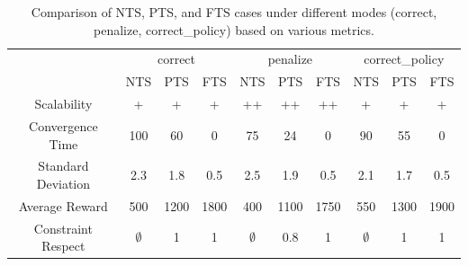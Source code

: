 \documentclass[runningheads]{llncs}
\theoremstyle{freethm}
\theoremstyle{proofoutline}
\begin{document}
\begin{table}[h!]
    \centering
    \caption{Comparison of NTS, PTS, and FTS cases under different modes (correct, penalize, correct\_policy) based on various metrics.\\}\label{tab:results}
    \setlength{\tabcolsep}{5pt}
    \begin{tabular}{cccccccccc}
        \cline{2-10}
                           & \multicolumn{3}{c}{correct} & \multicolumn{3}{c}{penalize} & \multicolumn{3}{c}{correct\_policy}                                                         \\
        \cline{2-10}
                           & NTS                         & PTS                          & FTS                                 & NTS         & PTS  & FTS  & NTS         & PTS  & FTS  \\
        \hline
        Scalability        & +                           & +                            & +                                   & ++          & ++   & ++   & +           & +    & +    \\
        Convergence Time   & 100                         & 60                           & 0                                   & 75          & 24   & 0    & 90          & 55   & 0    \\
        Standard Deviation & 2.3                         & 1.8                          & 0.5                                 & 2.5         & 1.9  & 0.5  & 2.1         & 1.7  & 0.5  \\
        Average Reward     & 500                         & 1200                         & 1800                                & 400         & 1100 & 1750 & 550         & 1300 & 1900 \\
        Constraint Respect & $\emptyset$                 & 1                            & 1                                   & $\emptyset$ & 0.8  & 1    & $\emptyset$ & 1    & 1    \\
    \end{tabular}
\end{table}
%
%
%
%
%
\end{document}
